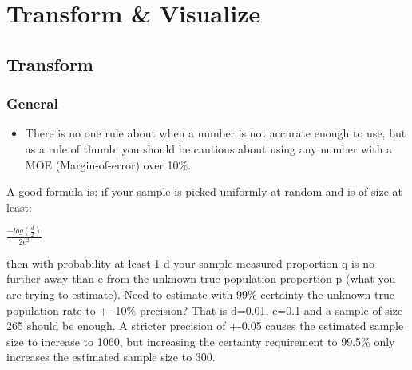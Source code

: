 \documentclass[]{book}
\providecommand{\tightlist}{%
  \setlength{\itemsep}{0pt}\setlength{\parskip}{0pt}}
\theoremstyle{definition}
\theoremstyle{definition}
\theoremstyle{definition}
\theoremstyle{remark}
\begin{document}
\chapter{Transform \& Visualize}\label{transform-visualize}

\section{Transform}\label{transform-1}

\subsection{General}\label{general}

\begin{itemize}
\tightlist
\item
  There is no one rule about when a number is not accurate enough to
  use, but as a rule of thumb, you should be cautious about using any
  number with a MOE (Margin-of-error) over 10\%.
\end{itemize}

A good formula is: if your sample is picked uniformly at random and is
of size at least:

\(\frac{-log(\frac{d}{2})}{2e^2}\)

then with probability at least 1-d your sample measured proportion q is
no further away than e from the unknown true population proportion p
(what you are trying to estimate). Need to estimate with 99\% certainty
the unknown true population rate to +- 10\% precision? That is d=0.01,
e=0.1 and a sample of size 265 should be enough. A stricter precision of
+-0.05 causes the estimated sample size to increase to 1060, but
increasing the certainty requirement to 99.5\% only increases the
estimated sample size to 300.
\end{document}

